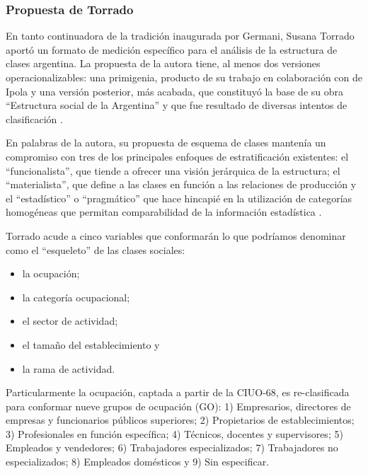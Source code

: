 \documentclass[
]{book}
\providecommand{\tightlist}{%
  \setlength{\itemsep}{0pt}\setlength{\parskip}{0pt}}
\begin{document}
\hypertarget{propuesta-de-torrado}{%
\subsubsection{Propuesta de Torrado}\label{propuesta-de-torrado}}

En tanto continuadora de la tradición inaugurada por Germani, Susana Torrado aportó un formato de medición específico para el análisis de la estructura de clases argentina. La propuesta de la autora tiene, al menos dos versiones operacionalizables: una primigenia, producto de su trabajo en colaboración con de Ipola \citep{Ipola1976} y una versión posterior, más acabada, que constituyó la base de su obra ``Estructura social de la Argentina'' \citep{Torrado1992} y que fue resultado de diversas intentos de clasificación \citep{CFI1988, Torrado.Rofman1988}.

En palabras de la autora, su propuesta de esquema de clases mantenía un compromiso con tres de los principales enfoques de estratificación existentes: el ``funcionalista'', que tiende a ofrecer una visión jerárquica de la estructura; el ``materialista'', que define a las clases en función a las relaciones de producción y el ``estadístico'' o ``pragmático'' que hace hincapié en la utilización de categorías homogéneas que permitan comparabilidad de la información estadística \citep{Torrado1998d}.

Torrado acude a cinco variables que conformarán lo que podríamos denominar como el ``esqueleto'' de las clases sociales:

\begin{itemize}
\tightlist
\item
  la ocupación;\\
\item
  la categoría ocupacional;
\item
  el sector de actividad;
\item
  el tamaño del establecimiento y\\
\item
  la rama de actividad.
\end{itemize}

Particularmente la ocupación, captada a partir de la CIUO-68, es re-clasificada para conformar nueve grupos de ocupación (GO): 1) Empresarios, directores de empresas y funcionarios públicos superiores; 2) Propietarios de establecimientos; 3) Profesionales en función específica; 4) Técnicos, docentes y supervisores; 5) Empleados y vendedores; 6) Trabajadores especializados; 7) Trabajadores no especializados; 8) Empleados domésticos y 9) Sin especificar.
\end{document}

